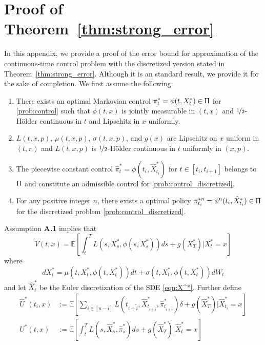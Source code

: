 \documentclass{article}
\numberwithin{equation}{section}
\begin{document}
 \appendix
 \section{Proof of Theorem~\ref{thm:strong_error}}
 \label{sec:error}
 In this appendix, we provide a proof of the error bound for approximation of the continuous-time control problem with the discretized version stated in Theorem~\ref{thm:strong_error}. Although it is an standard result, we provide it for the sake of completion. We first assume the following:
 \begin{enumerate}[label=\bfseries A.\arabic*.]
     \item There exists an optimal Markovian control $\pi^*_t= \phi(t,X^*_t)\in\Uppi$ for \eqref{prob:control} such that $\phi(t,x)$ is jointly measurable in $(t,x)$ and $\nicefrac{1}{2}$-Hölder continuous in $t$ and Lipschitz in $x$ uniformly.
     \item $L(t,x,p)$, $\mu(t,x,p)$, $\sigma(t,x,p)$, and $g(x)$ are Lipschitz on $x$ uniform in$(t,\pi)$ and  $L(t,x,p)$ is $\nicefrac{1}{2}$-Hölder continuous in $t$ uniformly in $(x,p)$.
      \item The piecewise constant control $\hat{\pi}^*_t=\phi(t_{i},\hat{X}^*_{t_{i}})$ for $t\in[t_i,t_{i+1}]$ belongs to $\Uppi$ and constitute an admissible control for \eqref{prob:control_discretized}.
     \item For any positive integer $n$, there exists a optimal policy $\pi^{*n}_{t_i}=\phi^n(t_i,\hat{X}^*_{t_i})\in\Uppi$ for the discretized problem \eqref{prob:control_discretized}.
 \end{enumerate}
 Assumption \textbf{A.1} implies that 
 \begin{equation}
    V(t,x)=\mathbb{E}\left[\int_t^TL(s,X^*_s,\phi(s,X^*_s))ds + g(X_T^*)\bigg| X_t^*=x\right] 
\end{equation}
where 
\begin{equation}\label{eqn:X^*}
    dX^*_t =\mu(t,X_t^*,\phi(t,X^*_t))dt+\sigma(t,X^*_t,\phi(t,X^*_t))dW_t
\end{equation} 
and let $\hat{X}^*_t$ be the Euler discretization of the SDE \eqref{eqn:X^*}. 
Further define  
\begin{equation}
\begin{split}
    \hat{U}^*(t_{i},x)&:=\mathbb{E}\left[\sum_{\hat{i}\in[n-i]}L(t_{i+\hat{i}},\hat{X}^*_{t_{i+\hat{i}}},\hat{\pi}^*_{t_{i+\hat{i}}})\delta + g(\hat{X}_T^{*})\bigg|\hat{X}^{*}_{t_i}=x\right]\\
    {U}^*(t,x)&:=\mathbb{E}\left[\int_t^T L(s,\hat{X}^*_{s},\hat{\pi}^*_s)ds + g(\hat{X}_T^{*})\bigg|\hat{X}^{*}_{t}=x\right]
\end{split}
\end{equation}
\end{document}
